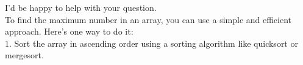 \documentclass[preview]{standalone}
\begin{document}
I'd be happy to help with your question.\\To find the maximum number in an array, you can use a simple and efficient approach. Here's one way to do it:\\1. Sort the array in ascending order using a sorting algorithm like quicksort or mergesort.\\
\end{document}
